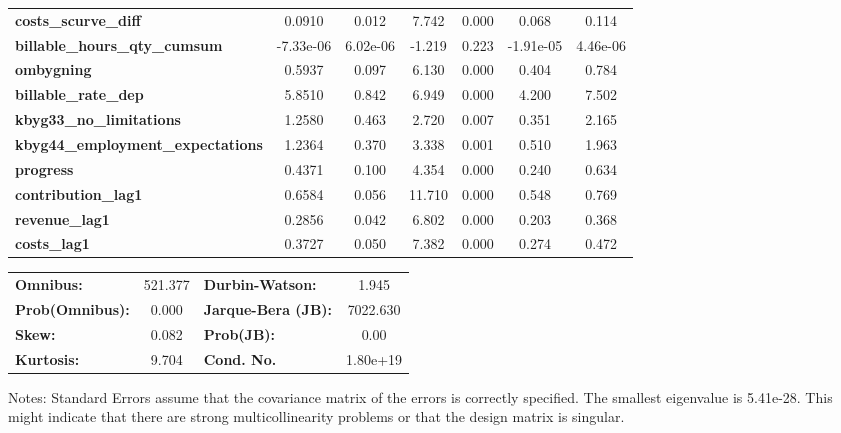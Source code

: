 \begin{center}
\begin{tabular}{lcccccc}
\textbf{costs\_scurve\_diff}              &       0.0910  &        0.012     &     7.742  &         0.000        &        0.068    &        0.114     \\
\textbf{billable\_hours\_qty\_cumsum}     &    -7.33e-06  &     6.02e-06     &    -1.219  &         0.223        &    -1.91e-05    &     4.46e-06     \\
\textbf{ombygning}                        &       0.5937  &        0.097     &     6.130  &         0.000        &        0.404    &        0.784     \\
\textbf{billable\_rate\_dep}              &       5.8510  &        0.842     &     6.949  &         0.000        &        4.200    &        7.502     \\
\textbf{kbyg33\_no\_limitations}          &       1.2580  &        0.463     &     2.720  &         0.007        &        0.351    &        2.165     \\
\textbf{kbyg44\_employment\_expectations} &       1.2364  &        0.370     &     3.338  &         0.001        &        0.510    &        1.963     \\
\textbf{progress}                         &       0.4371  &        0.100     &     4.354  &         0.000        &        0.240    &        0.634     \\
\textbf{contribution\_lag1}               &       0.6584  &        0.056     &    11.710  &         0.000        &        0.548    &        0.769     \\
\textbf{revenue\_lag1}                    &       0.2856  &        0.042     &     6.802  &         0.000        &        0.203    &        0.368     \\
\textbf{costs\_lag1}                      &       0.3727  &        0.050     &     7.382  &         0.000        &        0.274    &        0.472     \\
\bottomrule
\end{tabular}
\begin{tabular}{lclc}
\textbf{Omnibus:}       & 521.377 & \textbf{  Durbin-Watson:     } &    1.945  \\
\textbf{Prob(Omnibus):} &   0.000 & \textbf{  Jarque-Bera (JB):  } & 7022.630  \\
\textbf{Skew:}          &   0.082 & \textbf{  Prob(JB):          } &     0.00  \\
\textbf{Kurtosis:}      &   9.704 & \textbf{  Cond. No.          } & 1.80e+19  \\
\bottomrule
\end{tabular}
\end{center}

Notes: \newline
 [1] Standard Errors assume that the covariance matrix of the errors is correctly specified. \newline
 [2] The smallest eigenvalue is 5.41e-28. This might indicate that there are \newline
 strong multicollinearity problems or that the design matrix is singular.